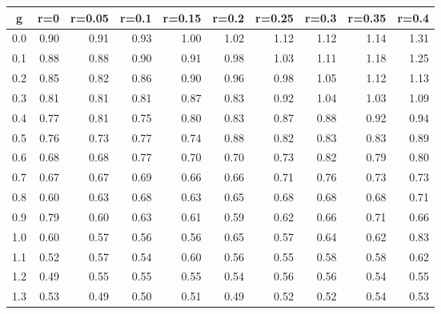 %
\begin{table}[!tbp]
 \begin{center}
 \begin{tabular}{rrrrrrrrrr}\hline\hline
\multicolumn{1}{c}{g}&\multicolumn{1}{c}{r=0}&\multicolumn{1}{c}{r=0.05}&\multicolumn{1}{c}{r=0.1}&\multicolumn{1}{c}{r=0.15}&\multicolumn{1}{c}{r=0.2}&\multicolumn{1}{c}{r=0.25}&\multicolumn{1}{c}{r=0.3}&\multicolumn{1}{c}{r=0.35}&\multicolumn{1}{c}{r=0.4}\tabularnewline
\hline
0.0&0.90&0.91&0.93&1.00&1.02&1.12&1.12&1.14&1.31\tabularnewline
0.1&0.88&0.88&0.90&0.91&0.98&1.03&1.11&1.18&1.25\tabularnewline
0.2&0.85&0.82&0.86&0.90&0.96&0.98&1.05&1.12&1.13\tabularnewline
0.3&0.81&0.81&0.81&0.87&0.83&0.92&1.04&1.03&1.09\tabularnewline
0.4&0.77&0.81&0.75&0.80&0.83&0.87&0.88&0.92&0.94\tabularnewline
0.5&0.76&0.73&0.77&0.74&0.88&0.82&0.83&0.83&0.89\tabularnewline
0.6&0.68&0.68&0.77&0.70&0.70&0.73&0.82&0.79&0.80\tabularnewline
0.7&0.67&0.67&0.69&0.66&0.66&0.71&0.76&0.73&0.73\tabularnewline
0.8&0.60&0.63&0.68&0.63&0.65&0.68&0.68&0.68&0.71\tabularnewline
0.9&0.79&0.60&0.63&0.61&0.59&0.62&0.66&0.71&0.66\tabularnewline
1.0&0.60&0.57&0.56&0.56&0.65&0.57&0.64&0.62&0.83\tabularnewline
1.1&0.52&0.57&0.54&0.60&0.56&0.55&0.58&0.58&0.62\tabularnewline
1.2&0.49&0.55&0.55&0.55&0.54&0.56&0.56&0.54&0.55\tabularnewline
1.3&0.53&0.49&0.50&0.51&0.49&0.52&0.52&0.54&0.53\tabularnewline
\hline
\end{tabular}

\end{center}

\end{table}

